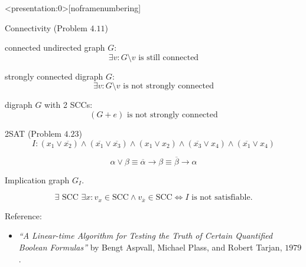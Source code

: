 \begin{frame}<presentation:0>[noframenumbering]
  \begin{exampleblock}{Connectivity (Problem $4.11$)}
	\begin{description}[Example:]
	  \item[Prove:] connected undirected graph $G$: 
		\[
		  \exists v: G \setminus v \text{ is still connected}
		\]
	  \item[Example:] strongly connected digraph $G$:
		\[
		  \exists v: G \setminus v \text{ is not strongly connected}
		\]
	  \item[Example:] digraph $G$ with 2 SCCs:
		\[
		  (G + e) \text{ is not strongly connected}
		\]
	\end{description}
  \end{exampleblock}
\end{frame}

\begin{frame}
  \begin{exampleblock}{2SAT (Problem $4.23$)}
    \[
      I: (x_1 \lor \overline{x_2}) \land (\overline{x_1} \lor \overline{x_3}) \land (x_1 \lor x_2) \land (\overline{x_3} \lor x_4) \land (\overline{x_1} \lor x_4)
    \]
  \end{exampleblock}

  \pause
  \[
    \alpha \lor \beta \equiv \overline{\alpha} \to \beta \equiv \overline{\beta} \to \alpha
  \]

  \pause
  \begin{center}
    Implication graph $G_I$.
  \end{center}

  \pause
  \begin{theorem}[2SAT]
    \[
      \exists \text{ SCC } \exists x: v_x \in \text{SCC} \land v_{\overline{x}} \in \text{SCC} \iff I \text{ is not satisfiable}.
    \]
  \end{theorem}

  \pause
  \begin{alertblock}{Reference:}
    \begin{itemize}
      \item {\it ``A Linear-time Algorithm for Testing the Truth of Certain Quantified Boolean Formulas''} 
	by Bengt Aspvall, Michael Plass, and Robert Tarjan, $1979$.
    \end{itemize}
  \end{alertblock}
\end{frame}

